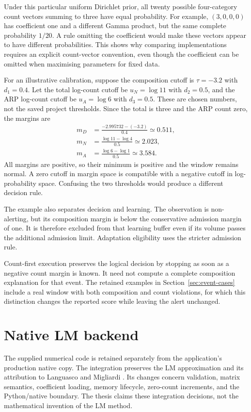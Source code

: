 Under this particular uniform Dirichlet prior, all twenty possible
four-category count vectors summing to three have equal probability.
For example, $(3,0,0,0)$ has coefficient one and a different Gamma
product, but the same complete probability $1/20$. A rule omitting
the coefficient would make these vectors appear to have different
probabilities. This shows why comparing implementations requires an
explicit count-vector convention, even though the coefficient can
be omitted when maximising parameters for fixed data.

For an illustrative calibration, suppose the composition cutoff is
$\tau=-3.2$ with $d_1=0.4$. Let the total log-count cutoff be
$u_N=\log11$ with $d_2=0.5$, and the ARP log-count cutoff be
$u_A=\log6$ with $d_3=0.5$. These are chosen numbers, not the saved
project thresholds. Since the total is three and the ARP count zero,
the margins are
\begin{align*}
 m_D&=\frac{-2.995732-(-3.2)}{0.4}\simeq0.511,\\
 m_N&=\frac{\log11-\log4}{0.5}\simeq2.023,\\
 m_A&=\frac{\log6-\log1}{0.5}\simeq3.584.
\end{align*}
All margins are positive, so their minimum is positive and the
window remains normal. A zero cutoff in margin space is compatible
with a negative cutoff in log-probability space. Confusing the two
thresholds would produce a different decision rule.

The example also separates decision and learning. The observation
is non-alerting, but its composition margin is below the conservative
admission margin of one. It is therefore excluded from that learning
buffer even if its volume passes the additional admission limit. Adaptation
eligibility uses the stricter admission rule.

Count-first execution preserves the logical decision by stopping
as soon as a negative count margin is known. It need not compute a
complete composition explanation for that event. The retained
examples in Section~\ref{sec:event-cases} include a real window with
both composition and count violations, for which this distinction
changes the reported score while leaving the alert unchanged.

\section{Native LM backend}
\label{sec:native-integration}

The supplied numerical code is retained separately from the application's
production native copy. The integration preserves the LM approximation
and its attribution to Languasco and Migliardi \cite{languasco2023}. Its
changes concern validation, matrix semantics, coefficient loading, memory
lifecycle, zero-count increments, and the Python/native boundary.
The thesis claims these integration decisions, not the mathematical
invention of the LM method.

